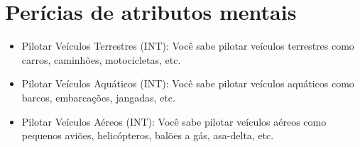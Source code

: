 \section{\label{sec:perMentais}Perícias de atributos mentais}

\begin{itemize}
	\item Pilotar Veículos Terrestres (INT): Você sabe pilotar veículos terrestres como carros, caminhões, motocicletas, etc.
	\item Pilotar Veículos Aquáticos (INT): Você sabe pilotar veículos aquáticos como barcos, embarcações, jangadas, etc.
	\item Pilotar Veículos Aéreos (INT): Você sabe pilotar veículos aéreos como pequenos aviões, helicópteros, balões a gás, asa-delta, etc.
\end{itemize}


